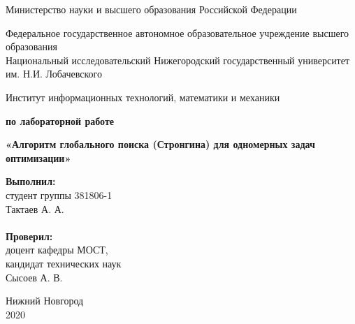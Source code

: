 \documentclass{report}
\begin{document}
\begin{titlepage}

\begin{center}
Министерство науки и высшего образования Российской Федерации
\end{center}

\begin{center}
Федеральное государственное автономное образовательное учреждение высшего образования \\
Национальный исследовательский Нижегородский государственный университет им. Н.И. Лобачевского
\end{center}

\begin{center}
Институт информационных технологий, математики и механики
\end{center}

\vspace{4em}

\begin{center}
\textbf{ по лабораторной работе} \\
\end{center}
\begin{center}
\textbf{\Large«Алгоритм глобального поиска (Стронгина) для одномерных задач оптимизации»} \\
\end{center}

\vspace{4em}

\newbox{\lbox}
\newlength{\maxl}
\setlength{\maxl}{\wd\lbox}
\hfill\parbox{7cm}{
\hspace*{5cm}\hspace*{-5cm}\textbf{Выполнил:} \\ студент группы 381806-1 \\ Тактаев А. А.\\
\\
\hspace*{5cm}\hspace*{-5cm}\textbf{Проверил:}\\ доцент кафедры МОСТ, \\ кандидат технических наук \\ Сысоев А. В.\\
}
\vspace{\fill}

\begin{center} Нижний Новгород \\ 2020 \end{center}

\end{titlepage}
\end{document}
